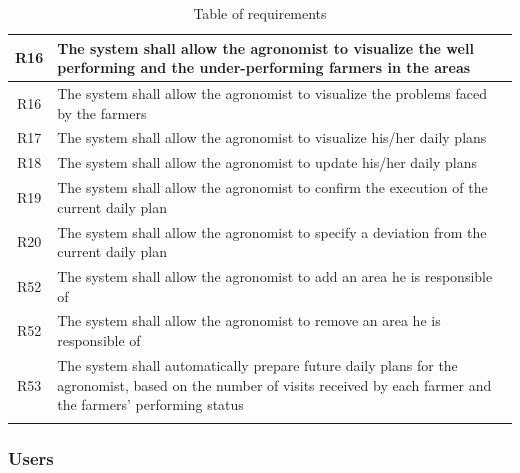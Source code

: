 \begin{center}
\begin{longtable}{|c|m{}|}
            \hline
            \textsc{R16}  &    The system shall allow the agronomist to visualize the well performing and the under-performing farmers in the areas  \\
            \hline
            \textsc{R16}  &    The system shall allow the agronomist to visualize the problems faced by the farmers  \\
            \hline
            \textsc{R17}  &    The system shall allow the agronomist to visualize his/her daily plans  \\
            \hline
            \textsc{R18}  &    The system shall allow the agronomist to update his/her daily plans  \\
            \hline
            \textsc{R19}  &    The system shall allow the agronomist to confirm the execution of the current daily plan  \\
            \hline
            \textsc{R20}  &    The system shall allow the agronomist to specify a deviation from the current daily plan  \\
            \hline
            \textsc{R52}  &    The system shall allow the agronomist to add an area he is responsible of  \\
            \hline
            \textsc{R52}  &    The system shall allow the agronomist to remove an area he is responsible of  \\
            \hline
            \textsc{R53}  &    The system shall automatically prepare future daily plans for the agronomist, based on the number of visits received by each farmer and the farmers' performing status  \\
            \hline
        
        \rowcolor{white}\caption{\label{tab:requirements}Table of requirements}
        
    \end{longtable}
\end{center}


\subsubsection{Users}
\label{sect:users_requirements}


